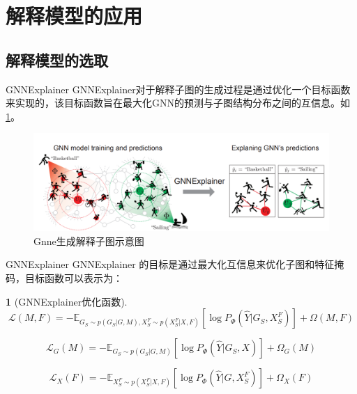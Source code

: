 \documentclass[UTF8, aspectratio=169,10pt]{beamer}%
\numberwithin{equation}{section}
\numberwithin{figure}{section}
\numberwithin{table}{section}
\theoremstyle{definition}
\newtheorem{defi}{}[section]
\begin{document}
\section{解释模型的应用}
\subsection{解释模型的选取}
\begin{frame}{GNNExplainer}
	GNNExplainer对于解释子图的生成过程是通过优化一个目标函数来实现的，该目标函数旨在最大化GNN的预测与子图结构分布之间的互信息。如\cref{fig:8}。
	\begin{figure}[htpb]
		\centering
		\includegraphics[width=1\linewidth]{fig/w8}
		\caption{Gnne生成解释子图示意图}
		\label{fig:8}
	\end{figure}
	
	
\end{frame}

\begin{frame}{GNNExplainer}
	GNNExplainer 的目标是通过最大化互信息来优化子图和特征掩码，目标函数可以表示为：
	\begin{defi}[GNNExplainer优化函数]
		\begin{equation}\mathcal{L}(M,F)=-\mathbb{E}_{G_S\sim p(G_S|G,M),X_S^F\sim p(X_S^F|X,F)}\left[\log P_\Phi(\hat{Y}|G_S,X_S^F)\right]+\Omega(M,F)\end{equation}
		
		\begin{equation}\mathcal{L}_G(M)=-\mathbb{E}_{G_S\sim p(G_S|G,M)}\left[\log P_\Phi(\hat{Y}|G_S,X)\right]+\Omega_G(M)\end{equation}
		
		\begin{equation}\mathcal{L}_X(F)=-\mathbb{E}_{X_S^F\sim p(X_S^F|X,F)}\left[\log P_\Phi(\hat{Y}|G,X_S^F)\right]+\Omega_X(F)\end{equation}
	\end{defi}
\end{frame}
\end{document}
